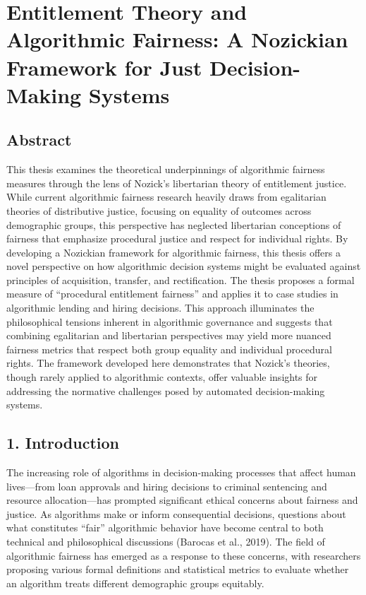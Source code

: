 \section{Entitlement Theory and Algorithmic Fairness: A Nozickian
Framework for Just Decision-Making
Systems}\label{entitlement-theory-and-algorithmic-fairness-a-nozickian-framework-for-just-decision-making-systems}

\subsection{Abstract}\label{abstract}

This thesis examines the theoretical underpinnings of algorithmic
fairness measures through the lens of Nozick's libertarian theory of
entitlement justice. While current algorithmic fairness research heavily
draws from egalitarian theories of distributive justice, focusing on
equality of outcomes across demographic groups, this perspective has
neglected libertarian conceptions of fairness that emphasize procedural
justice and respect for individual rights. By developing a Nozickian
framework for algorithmic fairness, this thesis offers a novel
perspective on how algorithmic decision systems might be evaluated
against principles of acquisition, transfer, and rectification. The
thesis proposes a formal measure of ``procedural entitlement fairness''
and applies it to case studies in algorithmic lending and hiring
decisions. This approach illuminates the philosophical tensions inherent
in algorithmic governance and suggests that combining egalitarian and
libertarian perspectives may yield more nuanced fairness metrics that
respect both group equality and individual procedural rights. The
framework developed here demonstrates that Nozick's theories, though
rarely applied to algorithmic contexts, offer valuable insights for
addressing the normative challenges posed by automated decision-making
systems.

\subsection{1. Introduction}\label{introduction}

The increasing role of algorithms in decision-making processes that
affect human lives---from loan approvals and hiring decisions to
criminal sentencing and resource allocation---has prompted significant
ethical concerns about fairness and justice. As algorithms make or
inform consequential decisions, questions about what constitutes
``fair'' algorithmic behavior have become central to both technical and
philosophical discussions (Barocas et al., 2019). The field of
algorithmic fairness has emerged as a response to these concerns, with
researchers proposing various formal definitions and statistical metrics
to evaluate whether an algorithm treats different demographic groups
equitably.

